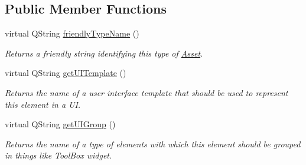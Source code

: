 \subsection*{Public Member Functions}
\begin{DoxyCompactItemize}
\item 
virtual Q\-String \hyperlink{class_picto_1_1_signal_value_parameter_a46e61720bc44c1ca8de8df10347a1cf0}{friendly\-Type\-Name} ()
\begin{DoxyCompactList}\small\item\em Returns a friendly string identifying this type of \hyperlink{class_picto_1_1_asset}{Asset}. \end{DoxyCompactList}\item 
\hypertarget{class_picto_1_1_signal_value_parameter_a6410a871833662eac34ac3c677e66d32}{virtual Q\-String \hyperlink{class_picto_1_1_signal_value_parameter_a6410a871833662eac34ac3c677e66d32}{get\-U\-I\-Template} ()}\label{class_picto_1_1_signal_value_parameter_a6410a871833662eac34ac3c677e66d32}

\begin{DoxyCompactList}\small\item\em Returns the name of a user interface template that should be used to represent this element in a U\-I. \end{DoxyCompactList}\item 
\hypertarget{class_picto_1_1_signal_value_parameter_acbef1094956947d3489c3bfab92fb9f5}{virtual Q\-String \hyperlink{class_picto_1_1_signal_value_parameter_acbef1094956947d3489c3bfab92fb9f5}{get\-U\-I\-Group} ()}\label{class_picto_1_1_signal_value_parameter_acbef1094956947d3489c3bfab92fb9f5}

\begin{DoxyCompactList}\small\item\em Returns the name of a type of elements with which this element should be grouped in things like Tool\-Box widget. \end{DoxyCompactList}\end{DoxyCompactItemize}
